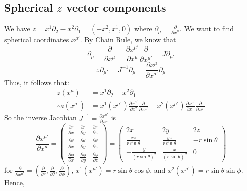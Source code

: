 \documentclass{article}
\begin{document}
 			\subsection{Spherical $z$ vector components}
 			We have
 			$ z = x^1 \partial_2 - x^2 \partial_1 = (-x^2, x^1, 0)$
 			where $\partial_\mu = \frac{\partial}{\partial x^\mu}$. We want to find spherical coordinates $x^{\mu'}$. By Chain Rule, we know that
 			$$ \partial_\mu = \frac{\partial}{\partial x^\mu} = \frac{\partial x^{\mu '}}{\partial x^\mu} \frac{\partial}{\partial x^{\mu'}} = J \partial_{\mu '}$$
 			$$ \therefore \partial_{\mu'} = J^{-1} \partial_\mu = \frac{\partial x^\mu}{\partial x^{\mu '}} \partial_\mu$$
 			Thus, it follows that:
 			\begin{align*}
 				z(x^\mu) &= x^1 \partial_2 - x^2 \partial_1 \\
 				\therefore z(x^{\mu'}) &= x^1(x^{\mu'}) \frac{\partial x^{\mu'}}{\partial x^2} \frac{\partial}{\partial x^{\mu'}} - x^2 (x^{\mu '}) \frac{\partial x^{\mu'}}{\partial x^1}\frac{\partial }{\partial x^{\mu'}}
 			\end{align*}
 			So the inverse Jacobian $J^{-1} = \frac{\partial x^{\mu'}}{\partial x^\mu}$ is
 			$$\frac{\partial x^{\mu'}}{\partial x^\mu} = 
 				\begin{pmatrix}
 					\frac{\partial r}{\partial x}	&	\frac{\partial r}{\partial y} &	\frac{\partial r}{\partial z} \\
 					\frac{\partial \theta}{\partial x} & \frac{\partial \theta}{\partial y} & \frac{\partial \theta}{\partial z} \\
 					\frac{\partial \phi}{\partial x} & \frac{\partial \phi}{\partial y} & \frac{\partial \phi}{\partial z} 				
 				\end{pmatrix} = \begin{pmatrix}
 				2x & 2y & 2z \\
 				\frac{xz}{r\sin \theta} & \frac{yz}{r\sin \theta} & -r \sin \theta \\
 				- \frac{y}{\left(r \sin \theta \right)^2} & \frac{x}{\left(r \sin \theta \right)^2} & 0
 			\end{pmatrix}
 			$$
 			for $\frac{\partial}{\partial x^{\mu'}} = \left( \frac{\partial}{\partial r}, \frac{\partial}{\partial \theta}, \frac{\partial}{\partial \phi}\right)$, $x^1 (x^{\mu'}) = r\sin\theta\cos\phi$, and $x^2 (x^{\mu'}) = r\sin\theta\sin\phi$.
 			Hence,
\end{document}
